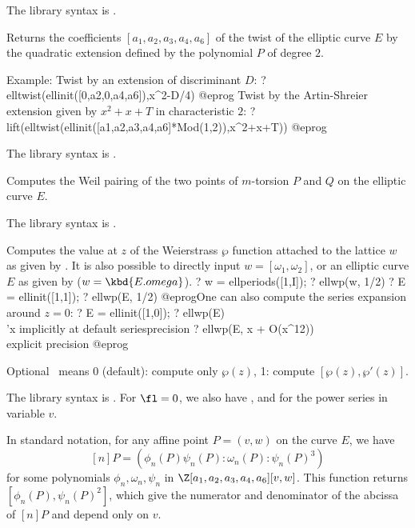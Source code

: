 The library syntax is .

\label{se:elltwist}
Returns the coefficients $[a_1,a_2,a_3,a_4,a_6]$ of the twist of the
elliptic curve $E$ by the quadratic extension defined by the polynomial $P$ of
degree $2$.

Example: Twist by an extension of discriminant $D$:
\bprog
? elltwist(ellinit([0,a2,0,a4,a6]),x^2-D/4)
@eprog
Twist by the Artin-Shreier extension given by $x^2+x+T$ in
characteristic $2$:
\bprog
? lift(elltwist(ellinit([a1,a2,a3,a4,a6]*Mod(1,2)),x^2+x+T))
@eprog

The library syntax is .

\label{se:ellweilpairing}
Computes the Weil pairing of the two points of $m$-torsion $P$ and $Q$
on the elliptic curve $E$.

The library syntax is .

\label{se:ellwp}
Computes the value at $z$ of the Weierstrass $\wp$ function attached to
the lattice $w$ as given by . It is also possible to
directly input $w = [\omega_1,\omega_2]$, or an elliptic curve $E$ as given
by  ($w = \kbd{E.omega}$).
\bprog
? w = ellperiods([1,I]);
? ellwp(w, 1/2)
? E = ellinit([1,1]);
? ellwp(E, 1/2)
@eprog\noindent One can also compute the series expansion around $z = 0$:
\bprog
? E = ellinit([1,0]);
? ellwp(E)              \\ 'x implicitly at default seriesprecision
? ellwp(E, x + O(x^12)) \\ explicit precision
@eprog

Optional \fl\ means 0 (default): compute only $\wp(z)$, 1: compute
$[\wp(z),\wp'(z)]$.

The library syntax is .
For $\fl = 0$, we also have
, and
 for the power series in
variable $v$.

\label{se:ellxn}
In standard notation, for any affine point $P = (v,w)$ on the
curve $E$, we have
$$[n]P = (\phi_n(P)\psi_n(P) : \omega_n(P) : \psi_n(P)^3)$$
for some polynomials $\phi_n,\omega_n,\psi_n$ in
$\Z[a_1,a_2,a_3,a_4,a_6][v,w]$. This function returns
$[\phi_n(P),\psi_n(P)^2]$, which give the numerator and denominator of
the abcissa of $[n]P$ and depend only on $v$.

